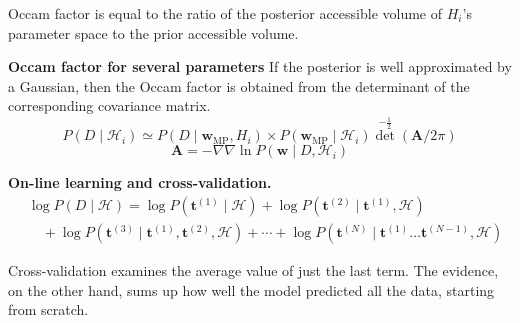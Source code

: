 \documentclass{article}
\begin{document}
Occam factor is equal to the ratio of the posterior accessible volume of $H_i$’s parameter space to the prior accessible volume.

\textbf{Occam factor for several parameters}
If the posterior is well approximated by a Gaussian, then the Occam factor is obtained from the determinant of the corresponding covariance matrix.
\begin{equation}
    P\left(D \mid \mathcal{H}_{i}\right) \simeq P\left(D \mid \mathbf{w}_{\mathrm{MP}}, H_{i}\right) \times P\left(\mathbf{w}_{\mathrm{MP}} \mid \mathcal{H}_{i}\right) \operatorname{det}^{-\frac{1}{2}}(\mathbf{A} / 2 \pi)
\end{equation}
\begin{equation}
    \mathbf{A}=-\nabla \nabla \ln P\left(\mathbf{w} \mid D, \mathcal{H}_{i}\right)
\end{equation}

\textbf{On-line learning and cross-validation.}
\begin{equation}
    \begin{aligned}
    &\log P(D \mid \mathcal{H})=\log P\left(\mathbf{t}^{(1)} \mid \mathcal{H}\right)+\log P\left(\mathbf{t}^{(2)} \mid \mathbf{t}^{(1)}, \mathcal{H}\right) \\
    &\quad+\log P\left(\mathbf{t}^{(3)} \mid \mathbf{t}^{(1)}, \mathbf{t}^{(2)}, \mathcal{H}\right)+\cdots+\log P\left(\mathbf{t}^{(N)} \mid \mathbf{t}^{(1)} \ldots \mathbf{t}^{(N-1)}, \mathcal{H}\right)
    \end{aligned}
\end{equation}

Cross-validation examines the average value of just the last term. The evidence, on the other hand, sums up how well the model predicted all the data, starting from scratch.


% 
\appendix
\end{document}
